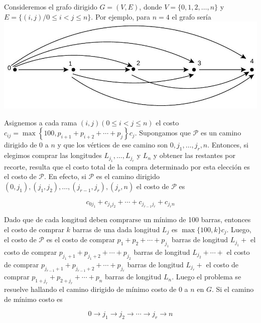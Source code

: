 \documentclass[10pt]{article}
\begin{document}
Consideremos el grafo dirigido $G=(V, E)$, donde $V=\{0,1,2, \ldots, n\}$ y $E=\{(i, j) / 0 \leq i<j \leq n\}$. Por ejemplo, para $n=4$ el grafo sería\\
\includegraphics[max width=\textwidth, center]{2025_09_05_93c7c1835f249f70c0eeg-27}

Asignemos a cada rama $(i, j)(0 \leq i<j \leq n)$ el costo $c_{i j}=\max \left\{100, p_{i+1}+p_{i+2}+\cdots+p_{j}\right\} c_{j}$. Supongamos que $\mathcal{P}$ es un camino dirigido de 0 a $n$ y que los vértices de ese camino son $0, j_{1}, \ldots, j_{r}, n$. Entonces, si elegimos comprar las longitudes $L_{j_{1}}, \ldots, L_{j_{r}}$ y $L_{n}$ y obtener las restantes por recorte, resulta que el costo total de la compra determinado por esta elección es el costo de $\mathcal{P}$. En efecto, si $\mathcal{P}$ es el camino dirigido $\left(0, j_{1}\right),\left(j_{1}, j_{2}\right), \ldots,\left(j_{r-1}, j_{r}\right),\left(j_{r}, n\right)$ el costo de $\mathcal{P}$ es

$$
c_{0 j_{1}}+c_{j_{1} j_{2}}+\cdots+c_{j_{r-1} j_{r}}+c_{j_{r} n}
$$

Dado que de cada longitud deben comprarse un mínimo de 100 barras, entonces el costo de comprar $k$ barras de una dada longitud $L_{j}$ es $\max \{100, k\} c_{j}$. Luego, el costo de $\mathcal{P}$ es el costo de comprar $p_{1}+p_{2}+\cdots+p_{j_{1}}$ barras de longitud $L_{j_{1}}+$ el costo de comprar $p_{j_{1}+1}+p_{j_{1}+2}+\cdots+p_{j_{2}}$ barras de longitud $L_{j_{2}}+\cdots+$ el costo de comprar $p_{j_{r-1}+1}+p_{j_{r-1}+2}+\cdots+p_{j_{r}}$ barras de longitud $L_{j_{r}}+$ el costo de comprar $p_{1+j_{r}}+p_{2+j_{r}}+\cdots+p_{n}$ barras de longitud $L_{n}$. Luego el problema se resuelve hallando el camino dirigido de mínimo costo de 0 a $n$ en $G$. Si el camino de mínimo costo es

$$
0 \longrightarrow j_{1} \longrightarrow j_{2} \longrightarrow \cdots \longrightarrow j_{r} \longrightarrow n
$$
\end{document}
